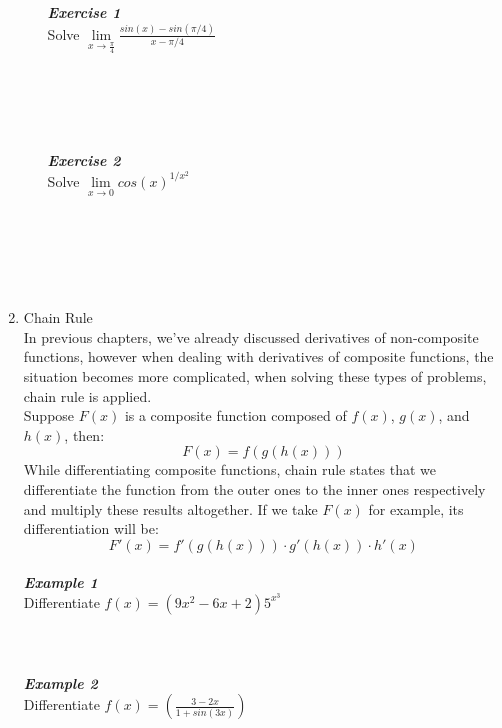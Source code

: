 \documentclass[12px]{article}
\begin{document}
\begin{enumerate}
\begin{enumerate}[i.]
\newpage
            \textbf{\textit{Exercise 1}}\\
            Solve $\lim\limits_{x\to\frac{\pi}{4}}\frac{sin(x)-sin(\pi/4)}{x-\pi/4}$\\
            \\
            \\
            \\
            \\
            \\
            \textbf{\textit{Exercise 2}}\\
            Solve $\lim\limits_{x\to0}cos(x)^{1/x^2}$\\
            \\
            \\
            \\
            \\
            \\
        \end{enumerate}
            \item Chain Rule\\
            \hspace*{2em}In previous chapters, we’ve already discussed derivatives of non-composite functions, however when dealing with derivatives of composite functions, the situation becomes more complicated, when solving these types of problems, chain rule is applied.\\
            \hspace*{2em}Suppose $F(x)$ is a composite function composed of $f(x)$, $g(x)$, and $h(x)$, then:
            $$F(x)=f(g(h(x)))$$
            \hspace*{2em}While differentiating composite functions, chain rule states that we differentiate the function from the outer ones to the inner ones respectively and multiply these results altogether. If we take $F(x)$ for example, its differentiation will be:
            $$F'(x)=f'(g(h(x)))\cdot g'(h(x))\cdot h'(x)$$\\
            \textbf{\textit{Example 1}}\\
            Differentiate $f(x)=(9x^2-6x+2)5^{x^3}$\\
            \\
            \\
            \\
            \textbf{\textit{Example 2}}\\
            Differentiate $f(x)=(\frac{3-2x}{1+sin(3x)})$\\
            \\

\end{enumerate}
\end{document}
